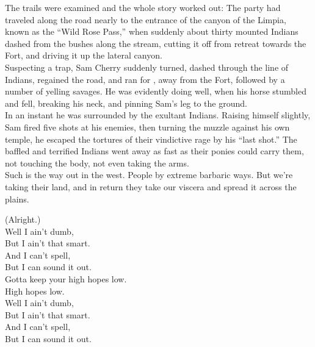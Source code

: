 The trails were examined and the whole story worked out: The party had traveled along the road nearly to the entrance of the canyon of the Limpia, known as the ``Wild Rose Pass,'' when suddenly about thirty mounted Indians dashed from the bushes along the stream, cutting it off from retreat towards the Fort, and driving it up the lateral canyon. \\

Suspecting a trap, Sam Cherry suddenly turned, dashed through the line of Indians, regained the road, and ran for , away from the Fort, followed by a number of yelling savages. He was evidently doing well, when his horse stumbled and fell, breaking his neck, and pinning Sam's leg to the ground. \\

In an instant he was surrounded by the exultant Indians. Raising himself slightly, Sam fired five shots at his enemies, then turning the muzzle against his own temple, he escaped the tortures of their vindictive rage by his ``last shot.'' The baffled and terrified Indians went away as fast as their ponies could carry them, not touching the body, not even taking the arms. \\

Such is the way out in the west. People  by extreme barbaric ways. But we're taking their land, and in return they take our viscera and spread it across the  plains. \\




(Alright.) \\

Well I ain't dumb, \\
But I ain't that smart. \\
And I can't spell, \\
But I can sound it out. \\

Gotta keep your high hopes low. \\

High hopes low. \\

Well I ain't dumb, \\
But I ain't that smart. \\
And I can't spell, \\
But I can sound it out. \\

